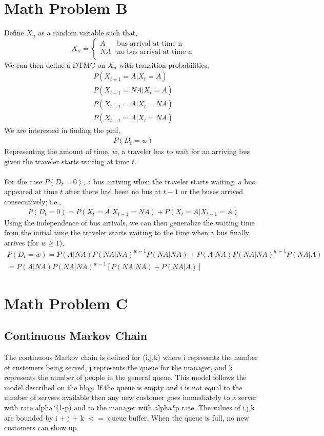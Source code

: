 \documentclass[10pt,a4paper]{article}
\begin{document}
\section{Math Problem B}
Define $X_n$ as a  random variable such that,
\[X_n = \begin{cases} 
A & \text{bus arrival at time n} \\
NA & \text{no bus arrival at time n} \\
\end{cases}\]
We can then define a DTMC on \(X_n\) with transition probabilities,
\begin{gather*}
P(X_{t+1}=A|X_t=A)\\
P(X_{t+1}=NA|X_t=A)\\
P(X_{t+1}=A|X_t=NA)\\
P(X_{t+1}=A|X_t=NA)
\end{gather*}
We are interested in finding the pmf,
\begin{align*}
P(D_t=w)
\end{align*}
Representing the amount of time, $w$, a traveler has to wait for an arriving
bus given the traveler starts waiting at time $t$.\\
\\
For the case $P(D_t=0)$, a bus arriving when the traveler starts waiting, a bus appeared at time $t$ after there had been no bus at $t-1$ or
the buses arrived consecutively; i.e.,\begin{align*}
P(D_t=0)=P(X_t=A|X_{t-1}=NA)+P(X_t=A|X_{t-1}=A)
\end{align*}
Using the independence of bus arrivals, we can then generalize the waiting
time from the initial time the traveler starts waiting to the time when a
bus finally arrives (for \(w\geq1\)),
\begin{gather*}
P(D_t=w)=P(A|NA)P(NA|NA)^{w-1}P(NA|NA)+P(A|NA)P(NA|NA)^{w-1}P(NA|A)\\
=P(A|NA)P(NA|NA)^{w-1}[P(NA|NA)+P(NA|A)]
\end{gather*}
\section{Math Problem C}
\subsection{Continuous Markov Chain}
The continuous Markov chain is defined for (i,j,k) where i represents the number of customers being served, j represents the queue for the manager, and k represents the number of people in the general queue. This model follows the model described on the blog. If the queue is empty and i is not equal to the number of servers available then any new customer goes immediately to a server with rate alpha*(1-p) and to the manager with alpha*p rate. The values of i,j,k are bounded by i + j + k $<=$ queue buffer. When the queue is full, no new customers can show up.
\end{document}
